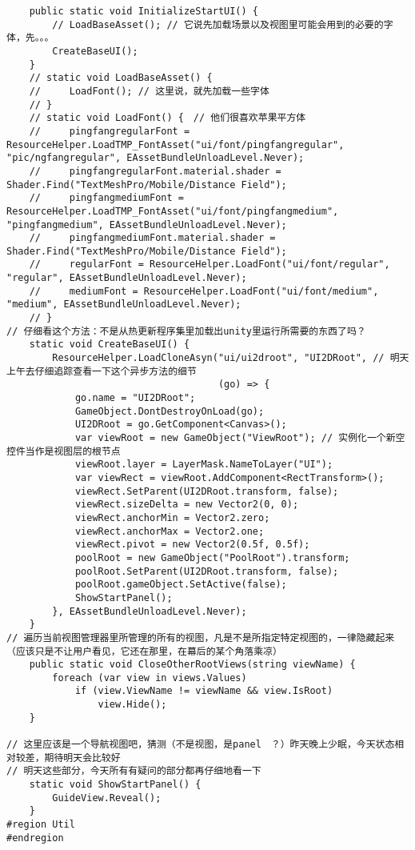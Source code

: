 \documentclass[9pt, b5paper]{article}
\begin{document}
\begin{verbatim}
    public static void InitializeStartUI() {
        // LoadBaseAsset(); // 它说先加载场景以及视图里可能会用到的必要的字体，先。。。
        CreateBaseUI();
    }
    // static void LoadBaseAsset() {
    //     LoadFont(); // 这里说，就先加载一些字体
    // }
    // static void LoadFont() {　// 他们很喜欢苹果平方体
    //     pingfangregularFont = ResourceHelper.LoadTMP_FontAsset("ui/font/pingfangregular", "pic/ngfangregular", EAssetBundleUnloadLevel.Never);
    //     pingfangregularFont.material.shader = Shader.Find("TextMeshPro/Mobile/Distance Field");
    //     pingfangmediumFont = ResourceHelper.LoadTMP_FontAsset("ui/font/pingfangmedium", "pingfangmedium", EAssetBundleUnloadLevel.Never);
    //     pingfangmediumFont.material.shader = Shader.Find("TextMeshPro/Mobile/Distance Field");
    //     regularFont = ResourceHelper.LoadFont("ui/font/regular", "regular", EAssetBundleUnloadLevel.Never);
    //     mediumFont = ResourceHelper.LoadFont("ui/font/medium", "medium", EAssetBundleUnloadLevel.Never);
    // }
// 仔细看这个方法：不是从热更新程序集里加载出unity里运行所需要的东西了吗？    
    static void CreateBaseUI() {
        ResourceHelper.LoadCloneAsyn("ui/ui2droot", "UI2DRoot", // 明天上午去仔细追踪查看一下这个异步方法的细节
                                     (go) => {
            go.name = "UI2DRoot";
            GameObject.DontDestroyOnLoad(go);
            UI2DRoot = go.GetComponent<Canvas>();
            var viewRoot = new GameObject("ViewRoot"); // 实例化一个新空控件当作是视图层的根节点
            viewRoot.layer = LayerMask.NameToLayer("UI");　
            var viewRect = viewRoot.AddComponent<RectTransform>();
            viewRect.SetParent(UI2DRoot.transform, false);
            viewRect.sizeDelta = new Vector2(0, 0);
            viewRect.anchorMin = Vector2.zero;
            viewRect.anchorMax = Vector2.one;
            viewRect.pivot = new Vector2(0.5f, 0.5f);
            poolRoot = new GameObject("PoolRoot").transform;
            poolRoot.SetParent(UI2DRoot.transform, false);
            poolRoot.gameObject.SetActive(false);
            ShowStartPanel();
        }, EAssetBundleUnloadLevel.Never);
    }
// 遍历当前视图管理器里所管理的所有的视图，凡是不是所指定特定视图的，一律隐藏起来（应该只是不让用户看见，它还在那里，在幕后的某个角落乘凉）
    public static void CloseOtherRootViews(string viewName) {
        foreach (var view in views.Values) 
            if (view.ViewName != viewName && view.IsRoot) 
                view.Hide();
    }
    
// 这里应该是一个导航视图吧，猜测（不是视图，是panel　？）昨天晚上少眠，今天状态相对较差，期待明天会比较好
// 明天这些部分，今天所有有疑问的部分都再仔细地看一下    
    static void ShowStartPanel() {
        GuideView.Reveal();
    }
#region Util
#endregion


\end{verbatim}
\end{document}
